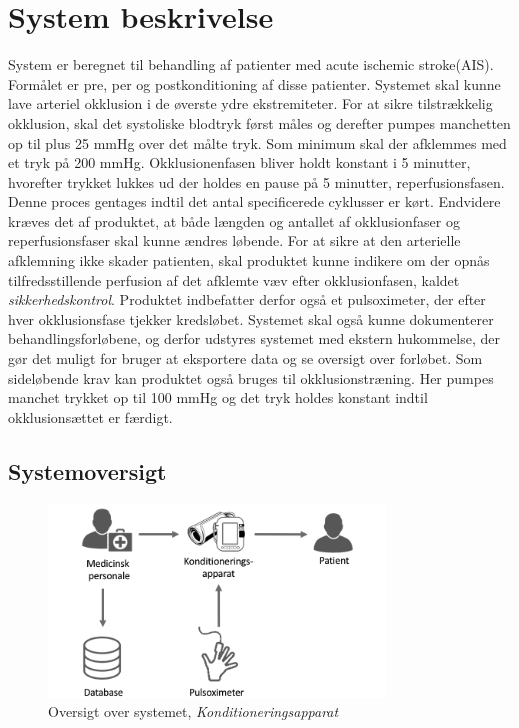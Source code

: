 \chapter{System beskrivelse}
System er beregnet til behandling af patienter med acute ischemic stroke(AIS). Formålet er pre, per og postkonditioning af disse patienter. Systemet skal kunne lave arteriel okklusion i de øverste ydre ekstremiteter. For at sikre tilstrækkelig okklusion, skal det systoliske blodtryk først måles og derefter pumpes manchetten op til plus 25 mmHg over det målte tryk. Som minimum skal der afklemmes med et tryk på 200 mmHg. Okklusionenfasen  bliver holdt konstant i 5 minutter, hvorefter trykket lukkes ud der holdes en \textquotedbl pause\textquotedbl{} på 5 minutter, reperfusionsfasen. Denne proces gentages indtil det antal specificerede cyklusser er kørt. Endvidere kræves det af produktet, at både længden og antallet af okklusionfaser og reperfusionsfaser skal kunne ændres løbende. 
For at sikre at den arterielle afklemning ikke skader patienten, skal produktet kunne indikere om der opnås tilfredsstillende perfusion af det afklemte væv efter okklusionfasen, kaldet \textit{sikkerhedskontrol}. Produktet indbefatter derfor også et pulsoximeter, der efter hver okklusionsfase tjekker kredsløbet. Systemet skal også kunne dokumenterer behandlingsforløbene, og derfor udstyres systemet med ekstern hukommelse, der gør det muligt for bruger at eksportere data og se oversigt over forløbet. 
Som sideløbende krav kan produktet også bruges til okklusionstræning. Her pumpes manchet trykket op til 100 mmHg og det tryk holdes konstant indtil okklusionsættet er færdigt.  

\section{Systemoversigt}
\begin{figure}[H]
	\centering
	\includegraphics[width=0.8\textwidth]{Kravspecifikation/Illustrationer/saelgertegning.png}
	\caption{Oversigt over systemet, \textit{Konditioneringsapparat}}
\end{figure}
